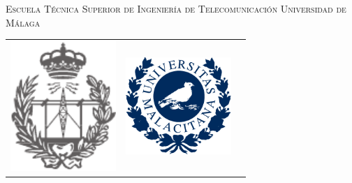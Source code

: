 

\begin{titlepage}
	\begin{center}
		\Large{\textsc{\textsf{		Escuela Técnica Superior de Ingeniería de Telecomunicación Universidad de Málaga}}}
	\end{center}
	
	\bigskip
	 
	\begin{center}
		\begin{tabular}{lcr}
			\includegraphics[width=4cm,keepaspectratio]{graphs/EscudoETSIT.pdf} & \hspace{2cm}
			\includegraphics[width=4cm,keepaspectratio]{graphs/UnivMalacitana.pdf}
		\end{tabular}
	\end{center}
	
	\bigskip
	

\end{titlepage}
